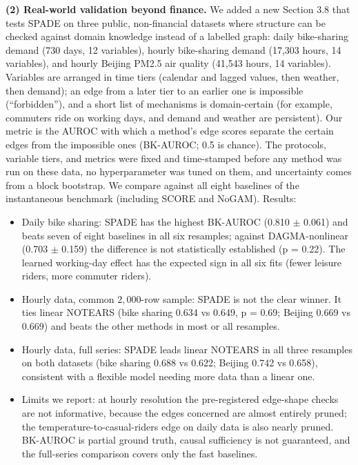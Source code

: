 \textbf{(2) Real-world validation beyond finance.} We added a new Section 3.8 that tests SPADE on three public, non-financial datasets where structure can be checked against domain knowledge instead of a labelled graph: daily bike-sharing demand (730 days, 12 variables), hourly bike-sharing demand (17,303 hours, 14 variables), and hourly Beijing PM2.5 air quality (41,543 hours, 14 variables). Variables are arranged in time tiers (calendar and lagged values, then weather, then demand); an edge from a later tier to an earlier one is impossible (``forbidden''), and a short list of mechanisms is domain-certain (for example, commuters ride on working days, and demand and weather are persistent). Our metric is the AUROC with which a method's edge scores separate the certain edges from the impossible ones (BK-AUROC; 0.5 is chance). The protocols, variable tiers, and metrics were fixed and time-stamped before any method was run on these data, no hyperparameter was tuned on them, and uncertainty comes from a block bootstrap. We compare against all eight baselines of the instantaneous benchmark (including SCORE and NoGAM). Results:
\begin{itemize}
\item Daily bike sharing: SPADE has the highest BK-AUROC (0.810 $\pm$ 0.061) and beats seven of eight baselines in all six resamples; against DAGMA-nonlinear (0.703 $\pm$ 0.159) the difference is not statistically established (p = 0.22). The learned working-day effect has the expected sign in all six fits (fewer leisure riders, more commuter riders).
\item Hourly data, common $2{,}000$-row sample: SPADE is not the clear winner. It ties linear NOTEARS (bike sharing 0.634 vs 0.649, p = 0.69; Beijing 0.669 vs 0.669) and beats the other methods in most or all resamples.
\item Hourly data, full series: SPADE leads linear NOTEARS in all three resamples on both datasets (bike sharing 0.688 vs 0.622; Beijing 0.742 vs 0.658), consistent with a flexible model needing more data than a linear one.
\item Limits we report: at hourly resolution the pre-registered edge-shape checks are not informative, because the edges concerned are almost entirely pruned; the temperature-to-casual-riders edge on daily data is also nearly pruned. BK-AUROC is partial ground truth, causal sufficiency is not guaranteed, and the full-series comparison covers only the fast baselines.
\end{itemize}

